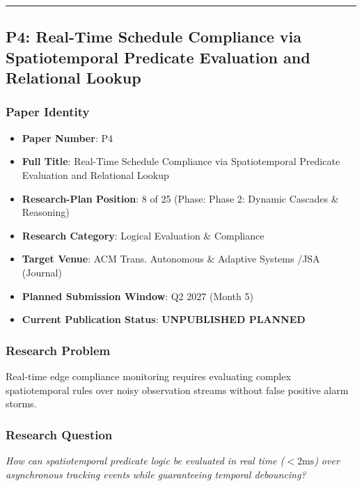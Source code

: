 \documentclass[11pt,letterpaper]{article}
\begin{document}
\vspace{0.4cm}
\hrule

\subsection{P4: Real-\allowbreak Time Schedule Compliance via Spatiotemporal Predicate Evaluation and Relational Lookup}
\label{sec:profile_p4}

\subsubsection{Paper Identity}
\begin{itemize}[leftmargin=*]
    \item \textbf{Paper Number}: P4
    \item \textbf{Full Title}: Real-\allowbreak Time Schedule Compliance via Spatiotemporal Predicate Evaluation and Relational Lookup
    \item \textbf{Research-Plan Position}: 8 of 25 (Phase: Phase 2: Dynamic Cascades \& Reasoning)
    \item \textbf{Research Category}: Logical Evaluation \& Compliance
    \item \textbf{Target Venue}: ACM Trans. Autonomous \& Adaptive Systems /\allowbreak  JSA (Journal)
    \item \textbf{Planned Submission Window}: Q2 2027 (Month 5)
    \item \textbf{Current Publication Status}: \textbf{UNPUBLISHED PLANNED}
\end{itemize}

\subsubsection{Research Problem}
Real-\allowbreak time edge compliance monitoring requires evaluating complex spatiotemporal rules over noisy observation streams without false positive alarm storms.

\subsubsection{Research Question}
\begin{tcolorbox}[colback=blue!3!white,colframe=blue!50!black,title=Primary Scientific Question]
\textit{How can spatiotemporal predicate logic be evaluated in real time ($<2\text{ms}$) over asynchronous tracking events while guaranteeing temporal debouncing?}
\end{tcolorbox}
\end{document}
